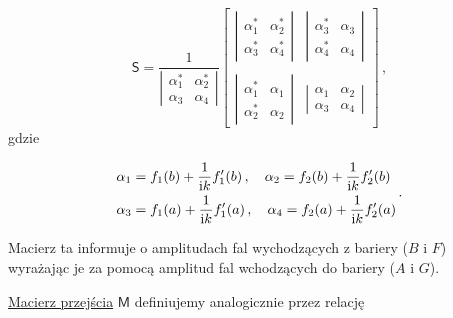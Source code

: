 \documentclass{myclass}
\begin{document}
\begin{equation*}
\mathsf{S}=\frac{1}{\left|\begin{matrix}
\alpha_1^* & \alpha_2^*\\
\alpha_3& \alpha_4
\end{matrix}\right|}
\begin{bmatrix}
\left|\begin{matrix}
\alpha_1^* & \alpha_2^*\\
\alpha_3^*& \alpha_4^*
\end{matrix}\right| & \left|\begin{matrix}
\alpha_3^* & \alpha_3\\
\alpha_4^*& \alpha_4
\end{matrix}\right|\\
    & \\
    
\left|\begin{matrix}
\alpha_1^* & \alpha_1\\
\alpha_2^*& \alpha_2
\end{matrix}\right| & \left|\begin{matrix}
\alpha_1 & \alpha_2\\
\alpha_3& \alpha_4
\end{matrix}\right|
\end{bmatrix}\,,
\end{equation*}
gdzie

\begin{equation*}
\begin{split}
    &\alpha_1=f_1(b)+\frac{1}{\mathrm{i} k}f_1'(b)\,,\quad \alpha_2=f_2(b)+\frac{1}{\mathrm{i} k}f_2'(b)\\
    &\alpha_3=f_1(a)+\frac{1}{\mathrm{i} k}f_1'(a)\,,\quad \alpha_4=f_2(a)+\frac{1}{\mathrm{i} k}f_2'(a)\\
\end{split}\,.
\end{equation*}

Macierz ta informuje o amplitudach fal wychodzących z bariery (\(B\) i \(F\)) wyrażając je za pomocą
amplitud fal wchodzących do bariery (\(A\) i \(G\)).
\medskip

\underline{Macierz przejścia} \(\mathsf{M}\) definiujemy analogicznie przez relację
\end{document}
